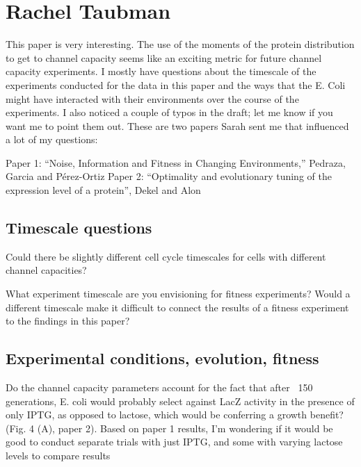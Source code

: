 \section{Rachel Taubman}

This paper is very interesting. The use of the moments of the protein
distribution to get to channel capacity seems like an exciting metric for future
channel capacity experiments. I mostly have questions about the timescale of the
experiments conducted for the data in this paper and the ways that the E. Coli
might have interacted with their environments over the course of the
experiments. I also noticed a couple of typos in the draft; let me know if you
want me to point them out. These are two papers Sarah sent me that influenced a
lot of my questions:

Paper 1: “Noise, Information and Fitness in Changing Environments,” Pedraza,
Garcia and Pérez-Ortiz
Paper 2: “Optimality and evolutionary tuning of the expression level of a
protein”, Dekel and Alon

\subsection{Timescale questions}
\begin{tcolorbox}
Could there be slightly different cell cycle timescales for cells with different
channel capacities?
\end{tcolorbox}

\begin{tcolorbox}
What experiment timescale are you envisioning for fitness experiments? Would a
different timescale make it difficult to connect the results of a fitness
experiment to the findings in this paper?
\end{tcolorbox}

\subsection{Experimental conditions, evolution, fitness}

\begin{tcolorbox}
Do the channel capacity parameters account for the fact that after ~150
generations, E. coli would probably select against LacZ activity in the presence
of only IPTG, as opposed to lactose, which would be conferring a growth benefit?
(Fig. 4 (A), paper 2). Based on paper 1 results, I’m wondering if it would be
good to conduct separate trials with just IPTG, and some with varying lactose
levels to compare results
\end{tcolorbox}

